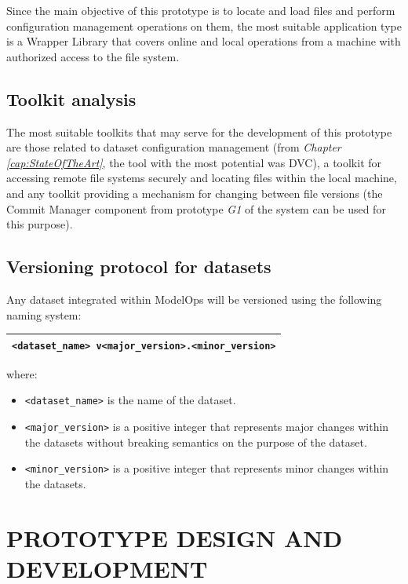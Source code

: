 Since the main objective of this prototype is to locate and load files and perform configuration management operations on them, the most suitable application type is a Wrapper Library 
that covers online and local operations from a machine with authorized access to the file system.

\subsection{Toolkit analysis}

The most suitable toolkits that may serve for the development of this prototype are those related to dataset configuration management (from \emph{Chapter \ref{cap:StateOfTheArt}},
the tool with the most potential was DVC), a toolkit for accessing remote file systems securely and locating files within the local machine, and any toolkit providing a 
mechanism for changing between file versions (the Commit Manager component from prototype \emph{G1} of the system can be used for this purpose).

\subsection{Versioning protocol for datasets}\label{sec:versioningProtocol}

Any dataset integrated within ModelOps will be versioned using the following naming system:

\begin{table}[H]
    \centering
    \begin{tabular}{|c|}
        \hline
        \texttt{<dataset\_name> v<major\_version>.<minor\_version>} \\ \hline
    \end{tabular}
\end{table}

where:

\begin{itemize}
    \item \texttt{<dataset\_name>} is the name of the dataset.
    \item \texttt{<major\_version>} is a positive integer that represents major changes within the datasets without breaking semantics on the purpose of the dataset.
    \item \texttt{<minor\_version>} is a positive integer that represents minor changes within the datasets.
\end{itemize}

\section{PROTOTYPE DESIGN AND DEVELOPMENT}

